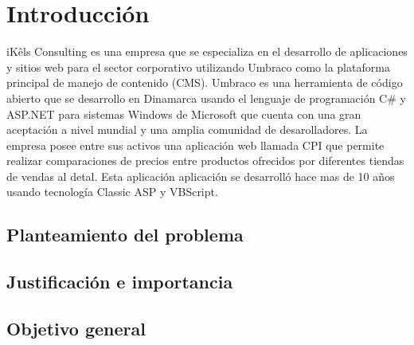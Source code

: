 \chapter*{Introducción}
iKêls Consulting es una empresa que se especializa en el desarrollo de aplicaciones y sitios web para el sector corporativo utilizando Umbraco como la plataforma principal de manejo de contenido (CMS). Umbraco es una herramienta de código abierto que se desarrollo en Dinamarca usando el lenguaje de programación C\# y ASP.NET para sistemas Windows de Microsoft que cuenta con una gran aceptación a nivel mundial y una amplia comunidad de desarolladores. La empresa posee entre sus activos una aplicación web llamada CPI que permite realizar comparaciones de precios entre productos ofrecidos por diferentes tiendas de vendas al detal. Esta aplicación aplicación se desarrolló hace mas de 10 años usando tecnología Classic ASP y VBScript.

\section*{Planteamiento del problema}

\section*{Justificación e importancia}

\section*{Objetivo general}

